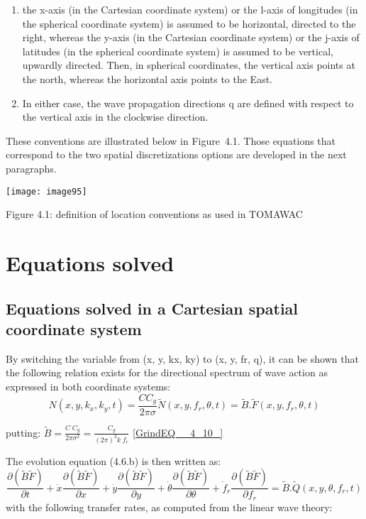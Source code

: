  \begin{enumerate}
\item the x-axis (in the Cartesian coordinate system) or the l-axis of longitudes (in the spherical coordinate system) is assumed to be horizontal, directed to the right, whereas the y-axis (in the Cartesian coordinate system) or the j-axis of latitudes (in the spherical coordinate system) is assumed to be vertical, upwardly directed. Then, in spherical coordinates, the vertical axis points at the north, whereas the horizontal axis points to the East.

 \item In either case, the wave propagation directions q are defined with respect to the vertical axis in the clockwise direction.
\end{enumerate}

 These conventions are illustrated below in Figure~4.1. Those equations that correspond to the two spatial discretizations options are developed in the next paragraphs.

\texttt{[image: image95]}

 Figure 4.1: definition of location conventions as used in TOMAWAC


\section{  Equations solved}


\subsection{ Equations solved in a Cartesian spatial coordinate system}

 By switching the variable from (x, y, kx, ky) to (x, y, fr, q), it can be shown that the following relation exists for the directional spectrum of wave action as expressed in both coordinate systems:
\begin{equation} \label{GrindEQ__4_9_}
N(x,y,k_{x} ,k_{y} ,t)=\frac{CC_{g} }{2\pi \sigma } \tilde{N}(x,y,f_{r} ,\theta ,t)=\tilde{B}.\tilde{F}(x,y,f_{r} ,\theta ,t)
\end{equation}

putting: $\tilde{B}=\frac{C\; C_{g} }{2\pi \sigma ^{2} } =\frac{C_{g} }{\left(2\pi \right)^{2} k\; f_{r} } $ \eqref{GrindEQ__4_10_}

The evolution equation (4.6.b) is then written as:
\begin{equation} \label{GrindEQ__4_11_}
\frac{\partial (\tilde{B}\tilde{F})}{\partial t} +\dot{x}\frac{\partial (\tilde{B}\tilde{F})}{\partial x} +\dot{y}\frac{\partial (\tilde{B}\tilde{F})}{\partial y} +\dot{\theta }\frac{\partial (\tilde{B}\tilde{F})}{\partial \theta } +\dot{f}_{r} \frac{\partial (\tilde{B}\tilde{F})}{\partial f_{r} } =\tilde{B}.\tilde{Q}(x,y,\theta ,f_{r} ,t)
\end{equation}
with the following transfer rates, as computed from the linear wave theory:

